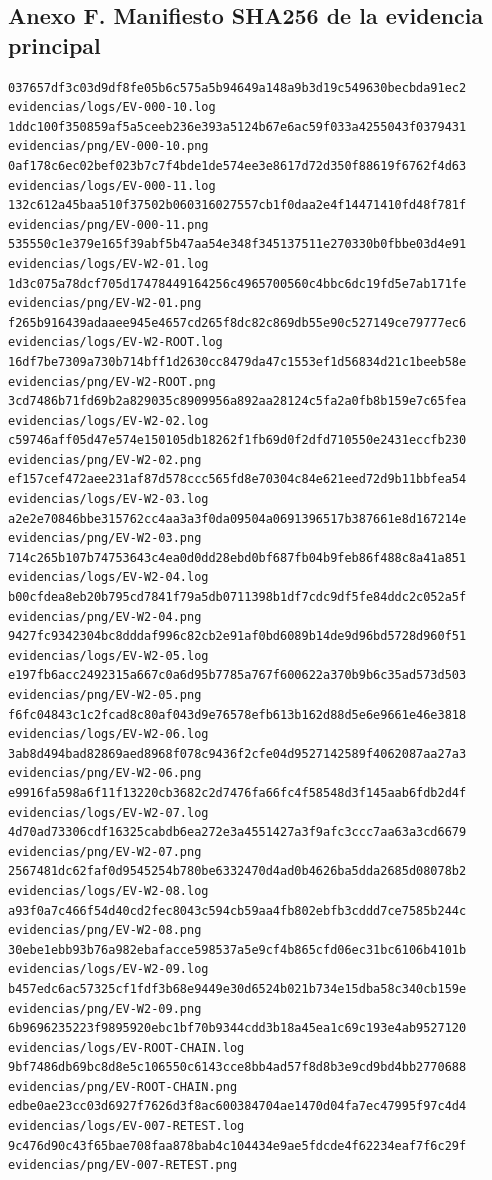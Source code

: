 \documentclass[11pt,a4paper]{article}
\begin{document}
\subsection{Anexo F. Manifiesto SHA256 de la evidencia principal}

\begin{lstlisting}
037657df3c03d9df8fe05b6c575a5b94649a148a9b3d19c549630becbda91ec2  evidencias/logs/EV-000-10.log
1ddc100f350859af5a5ceeb236e393a5124b67e6ac59f033a4255043f0379431  evidencias/png/EV-000-10.png
0af178c6ec02bef023b7c7f4bde1de574ee3e8617d72d350f88619f6762f4d63  evidencias/logs/EV-000-11.log
132c612a45baa510f37502b060316027557cb1f0daa2e4f14471410fd48f781f  evidencias/png/EV-000-11.png
535550c1e379e165f39abf5b47aa54e348f345137511e270330b0fbbe03d4e91  evidencias/logs/EV-W2-01.log
1d3c075a78dcf705d17478449164256c4965700560c4bbc6dc19fd5e7ab171fe  evidencias/png/EV-W2-01.png
f265b916439adaaee945e4657cd265f8dc82c869db55e90c527149ce79777ec6  evidencias/logs/EV-W2-ROOT.log
16df7be7309a730b714bff1d2630cc8479da47c1553ef1d56834d21c1beeb58e  evidencias/png/EV-W2-ROOT.png
3cd7486b71fd69b2a829035c8909956a892aa28124c5fa2a0fb8b159e7c65fea  evidencias/logs/EV-W2-02.log
c59746aff05d47e574e150105db18262f1fb69d0f2dfd710550e2431eccfb230  evidencias/png/EV-W2-02.png
ef157cef472aee231af87d578ccc565fd8e70304c84e621eed72d9b11bbfea54  evidencias/logs/EV-W2-03.log
a2e2e70846bbe315762cc4aa3a3f0da09504a0691396517b387661e8d167214e  evidencias/png/EV-W2-03.png
714c265b107b74753643c4ea0d0dd28ebd0bf687fb04b9feb86f488c8a41a851  evidencias/logs/EV-W2-04.log
b00cfdea8eb20b795cd7841f79a5db0711398b1df7cdc9df5fe84ddc2c052a5f  evidencias/png/EV-W2-04.png
9427fc9342304bc8dddaf996c82cb2e91af0bd6089b14de9d96bd5728d960f51  evidencias/logs/EV-W2-05.log
e197fb6acc2492315a667c0a6d95b7785a767f600622a370b9b6c35ad573d503  evidencias/png/EV-W2-05.png
f6fc04843c1c2fcad8c80af043d9e76578efb613b162d88d5e6e9661e46e3818  evidencias/logs/EV-W2-06.log
3ab8d494bad82869aed8968f078c9436f2cfe04d9527142589f4062087aa27a3  evidencias/png/EV-W2-06.png
e9916fa598a6f11f13220cb3682c2d7476fa66fc4f58548d3f145aab6fdb2d4f  evidencias/logs/EV-W2-07.log
4d70ad73306cdf16325cabdb6ea272e3a4551427a3f9afc3ccc7aa63a3cd6679  evidencias/png/EV-W2-07.png
2567481dc62faf0d9545254b780be6332470d4ad0b4626ba5dda2685d08078b2  evidencias/logs/EV-W2-08.log
a93f0a7c466f54d40cd2fec8043c594cb59aa4fb802ebfb3cddd7ce7585b244c  evidencias/png/EV-W2-08.png
30ebe1ebb93b76a982ebafacce598537a5e9cf4b865cfd06ec31bc6106b4101b  evidencias/logs/EV-W2-09.log
b457edc6ac57325cf1fdf3b68e9449e30d6524b021b734e15dba58c340cb159e  evidencias/png/EV-W2-09.png
6b9696235223f9895920ebc1bf70b9344cdd3b18a45ea1c69c193e4ab9527120  evidencias/logs/EV-ROOT-CHAIN.log
9bf7486db69bc8d8e5c106550c6143cce8bb4ad57f8d8b3e9cd9bd4bb2770688  evidencias/png/EV-ROOT-CHAIN.png
edbe0ae23cc03d6927f7626d3f8ac600384704ae1470d04fa7ec47995f97c4d4  evidencias/logs/EV-007-RETEST.log
9c476d90c43f65bae708faa878bab4c104434e9ae5fdcde4f62234eaf7f6c29f  evidencias/png/EV-007-RETEST.png
\end{lstlisting}
\end{document}
